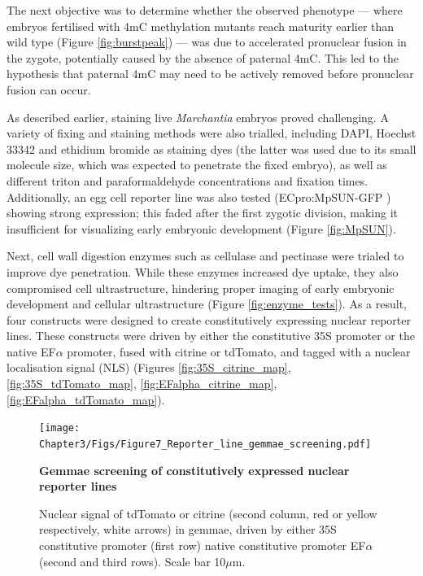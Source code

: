 The next objective was to determine whether the observed phenotype — where embryos fertilised with 4mC methylation mutants reach maturity earlier than wild type (Figure \ref{fig:burstpeak}) — was due to accelerated pronuclear fusion in the zygote, potentially caused by the absence of paternal 4mC. This led to the hypothesis that paternal 4mC may need to be actively removed before pronuclear fusion can occur.

As described earlier, staining live \textit{Marchantia} embryos proved challenging. A variety of fixing and staining methods were also trialled, including DAPI, Hoechst 33342 and ethidium bromide as staining dyes (the latter was used due to its small molecule size, which was expected to penetrate the fixed embryo), as well as different triton and paraformaldehyde concentrations and fixation times. Additionally, an egg cell reporter line was also tested (ECpro:MpSUN-GFP \citep{RN139}) showing strong expression; this faded after the first zygotic division, making it insufficient for visualizing early embryonic development (Figure \ref{fig:MpSUN}). 

Next, cell wall digestion enzymes such as cellulase and pectinase were trialed to improve dye penetration. While these enzymes increased dye uptake, they also compromised cell ultrastructure, hindering proper imaging of early embryonic development and cellular ultrastructure (Figure \ref{fig:enzyme_tests}). As a result, four constructs were designed to create constitutively expressing nuclear reporter lines. These constructs were driven by either the constitutive 35S promoter or the native EF$\alpha$ promoter, fused with citrine or tdTomato, and tagged with a nuclear localisation signal (NLS) (Figures \ref{fig:35S_citrine_map}, \ref{fig:35S_tdTomato_map}, \ref{fig:EFalpha_citrine_map}, \ref{fig:EFalpha_tdTomato_map}). 

\begin{figure}[htbp!] 
\centering    
    \texttt{[image: Chapter3/Figs/Figure7\_Reporter\_line\_gemmae\_screening.pdf]}
\caption{\textbf{Gemmae screening of constitutively expressed nuclear reporter lines}}
\label{fig:gemma:screen}
\captionsetup{font=small}
    \caption*{Nuclear signal of tdTomato or citrine (second column, red or yellow respectively, white arrows) in gemmae, driven by either 35S constitutive promoter (first row) native constitutive promoter EF$\alpha$ (second and third rows). Scale bar 10$\mu$m.}
\end{figure}

